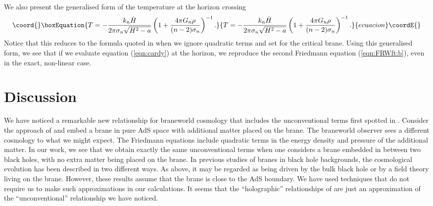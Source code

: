 \documentclass[a4paper,12pt]{article}
\begin{document}
We also present the generalised form of the temperature at the horizon
crossing
\begin{equation}\coord{}\boxEquation{ \label{eqn:T2}
T=-\frac{k_n\dot{H}}{2\pi\sigma_n\sqrt{H^2-a}} \left(1+\frac{4\pi
 G_n\rho}{(n-2)\sigma_n}\right)^{-1}.
}{ T=-\frac{k_n\dot{H}}{2\pi\sigma_n\sqrt{H^2-a}} \left(1+\frac{4\pi
 G_n\rho}{(n-2)\sigma_n}\right)^{-1}.
}{ecuacion}\coordE{}\end{equation}
Notice that this reduces to the formula quoted in
\cite{Savonije:braneCFT} when we ignore quadratic terms and set
\coordHE{} for the critical brane. Using this generalised form, we
see that if we evaluate equation (\ref{eqn:cardy}) at the horizon, we
reproduce the second Friedmann equation (\ref{eqn:FRWft:b}), even in
the exact, non-linear case.


\section{Discussion}

We have noticed a remarkable new relationship for braneworld cosmology
that includes the unconventional terms first spotted in
\cite{Binetruy:branecos1,Binetruy:branecos2}. Consider the approach of
\cite{Binetruy:branecos1,Binetruy:branecos2} and embed a brane in pure
AdS space with additional matter placed on the brane. The braneworld
observer sees a different cosmology to what we might expect. The
Friedmann equations include quadratic terms in the energy density and
pressure of the additional matter. In our work, we see that we obtain
exactly the same unconventional terms when one considers a brane
embedded in between two black holes, with no extra matter being placed
on the brane. In previous studies of branes in black hole backgrounds,
the cosmological evolution has been described in two different
ways. As above, it may be regarded as being driven by the bulk black
hole or by a field theory living on the brane. However, these results
assume that the brane is close to the AdS boundary. We have used
techniques that do not require us to make such approximations in our
calculations. It seems that the ``holographic'' relationships of
\cite{Savonije:braneCFT} are just an approximation of the
``unconventional'' relationship we have noticed.
\end{document}
